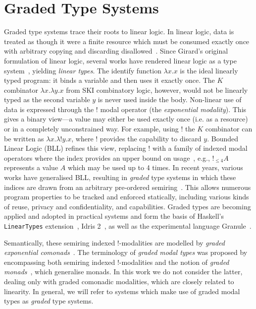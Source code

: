 \section{Graded Type Systems}

Graded type systems trace their roots to linear logic. In linear logic, data is
treated as though it were a finite resource which must be consumed exactly once
with arbitrary copying and discarding disallowed~\citep{girard1987linear}. Since
Girard's original formulation of linear logic, several works have rendered
linear logic as a type system~\citep{DBLP:conf/ifip2/Wadler90,ABRAMSKY19933},
yielding \emph{linear types}. The identify function $\lambda x . x$ is the ideal
linearly typed program: it binds a variable and then uses it exactly once. The
$K$ combinator $\lambda x . \lambda y . x$ from SKI combinatory logic, however,
would not be linearly typed as the second variable $y$ is never used inside the
body. Non-linear use of data is expressed through the $!$ modal operator (the
\emph{exponential modality}). This gives a binary view---a value may either be
used exactly once (i.e. as a resource) or in a completely unconstrained way. For
example, using $!$ the $K$ combinator can be written as $\lambda x. \lambda !y .
x$, where $!$ provides the capability to discard $y$. Bounded Linear Logic (BLL)
refines this view, replacing ! with a family of indexed modal operators where
the index provides an upper bound on usage~\citep{girard1992bounded}, e.g.,
$!_{\leq 4}A$ represents a value $A$ which may be used up to 4 times. In recent
years, various works have generalised BLL, resulting in \textit{graded} type
systems in which these indices are drawn from an arbitrary pre-ordered
semiring~\citep{DBLP:conf/esop/BrunelGMZ14,DBLP:conf/esop/GhicaS14,petricek2014coeffects,DBLP:journals/pacmpl/AbelB20,DBLP:journals/pacmpl/ChoudhuryEEW21,quantitative-type-theory,McBride2016}.
This allows numerous program properties to be tracked and enforced statically,
including various kinds of reuse, privacy and confidentiality, and capabilities.
Graded types are becoming applied and adopted in practical systems and form the
basis of Haskell's \texttt{LinearTypes}
extension~\citep{DBLP:journals/pacmpl/BernardyBNJS18}, Idris
2~\citep{DBLP:journals/corr/abs-2104-00480}, as well as the experimental
language Granule~\citep{DBLP:journals/pacmpl/OrchardLE19}.

Semantically, these semiring indexed $!$-modalities are modelled by \emph{graded
exponential comonads}~\citep{DBLP:conf/icfp/GaboardiKOBU16}. The terminology of
\textit{graded modal types} was proposed
by~\citet{DBLP:journals/pacmpl/OrchardLE19} encompassing both semiring indexed
!-modalities and the notion of \textit{graded
monads}~\citep{DBLP:journals/corr/OrchardPM14,DBLP:conf/popl/Katsumata14,
smirnov2008graded}, which generalise monads. In this work we do not consider the
latter, dealing only with graded comonadic modalities, which are closely related to
linearity. In general, we will refer to systems which make use of graded modal
types as \emph{graded} type systems. 

